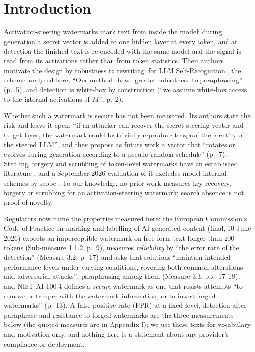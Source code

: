 \documentclass[11pt,letterpaper]{article}
\begin{document}
\hypertarget{introduction}{%
\section{Introduction}\label{introduction}}

Activation-steering watermarks mark text from inside the model: during generation a secret vector is added to one hidden layer at every token, and at detection the finished text is re-encoded with the same model and the signal is read from its activations rather than from token statistics. Their authors motivate the design by robustness to rewriting: for LLM Self-Recognition \citep{ardoin2026selfrecognition}, the scheme analysed here, ``Our method shows greater robustness to paraphrasing'' (p.~5), and detection is white-box by construction (``we assume white-box access to the internal activations of \(M\)'', p.~2).

Whether such a watermark is secure has not been measured. Its authors state the risk and leave it open: ``if an attacker can recover the secret steering vector and target layer, the watermark could be trivially reproduce to spoof the identity of the steered LLM'', and they propose as future work a vector that ``rotates or evolves during generation according to a pseudo-random schedule'' (p.~7). Stealing, forgery and scrubbing of token-level watermarks have an established literature \citep{jovanovic2024stealing, pang2024nofreelunch, gu2024learnability, zhang2026beyondseal}, and a September 2026 evaluation of it excludes model-internal schemes by scope \citep[p.~2]{li2026marksec}. To our knowledge, no prior work measures key recovery, forgery or scrubbing for an activation-steering watermark; search absence is not proof of novelty.

Regulators now name the properties measured here: the European Commission's Code of Practice on marking and labelling of AI-generated content (final, 10 June 2026) \citep{ec2026codeofpractice} expects an imperceptible watermark on free-form text longer than 200 tokens (Sub-measure 1.1.2, p.~9), measures \emph{reliability} by ``the error rate of the detection'' (Measure 3.2, p.~17) and asks that solutions ``maintain intended performance levels under varying conditions, covering both common alterations and adversarial attacks'', paraphrasing among them (Measure 3.3, pp.~17--18), and NIST AI 100-4 \citep{nist2024ai1004} defines a \emph{secure} watermark as one that resists attempts ``to remove or tamper with the watermark information, or to insert forged watermarks'' (p.~13). A false-positive rate (FPR) at a fixed level, detection after paraphrase and resistance to forged watermarks are the three measurements below (the quoted measures are in Appendix I); we use these texts for vocabulary and motivation only, and nothing here is a statement about any provider's compliance or deployment.
\end{document}
